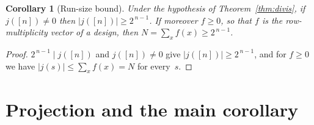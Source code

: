 \documentclass[11pt]{article}
\newif\ifdraftremarks
\newtheorem{corollary}[theorem]{Corollary}
\theoremstyle{definition}
\newtheorem{remark}[theorem]{Remark}
\newcommand{\Fpm}{\{-1,+1\}}
\newcommand{\jc}{j}
\begin{document}
\ifdraftremarks
\begin{remark}\color{blue}%
\footnote{This remark with explicit example is to be removed in the final paper.}
The hypothesis that $n$ is odd is essential. For even $n$ the set $[n]$ has
even cardinality and is not among the odd-order characteristics controlled by
\eqref{eq:divhyp}; the conclusion can fail.

\smallskip\noindent\textbf{Explicit counterexample at $n=4$.}
Define $f:\Fpm^4\to\mathbb Z$ by assigning multiplicity based on the number
of $-1$ entries (the weight~$w$):
\[
  f(x)=\begin{cases}
    3 & w\in\{0,4\},\\
    2 & w\in\{1,3\},\\
    0 & w=2.
  \end{cases}
\]
This is a (non-negative) design with $N=22$ rows. By the weight-based
symmetry, $\jc(s)=0$ for every subset~$s$ of odd cardinality ($|s|=1$
or~$3$). For the full set $[4]$, the product
$x_1 x_2 x_3 x_4=(-1)^w$, so
\[
  \jc([4])
  = 1{\cdot}3{\cdot}(+1)+4{\cdot}2{\cdot}(-1)
    +6{\cdot}0{\cdot}(+1)+4{\cdot}2{\cdot}(-1)
    +1{\cdot}3{\cdot}(+1)
  = -10,
\]
which is not divisible by~$2^3=8$.

Note that this design is not strength~3 (it has $\jc(\{i,j\})=6\ne0$).
Indeed, for any strength-3 design with $8\mid N$, the result of Deng and
Tang~(1999) gives $J_4(s)=N-16p$, forcing $8\mid J_4$ automatically.
The counterexample shows that the divisibility theorem applies to
\emph{general} integer-valued functions on the cube, not only to
orthogonal arrays.
\end{remark}
\fi

\begin{corollary}[Run-size bound]\label{cor:runbound}
Under the hypothesis of Theorem~\ref{thm:divis}, if $\jc([n])\ne 0$ then
$|\jc([n])|\ge 2^{\,n-1}$. If moreover $f\ge 0$, so that $f$ is the
row-multiplicity vector of a design, then $N=\sum_x f(x) \ge 2^{\,n-1}$.
\end{corollary}

\begin{proof}
$2^{\,n-1}\mid \jc([n])$ and $\jc([n])\ne 0$ give $|\jc([n])|\ge 2^{\,n-1}$,
and for $f\ge 0$ we have $|\jc(s)|\le\sum_x f(x)=N$ for every~$s$.
\end{proof}

\section{Projection and the main corollary}
\end{document}

